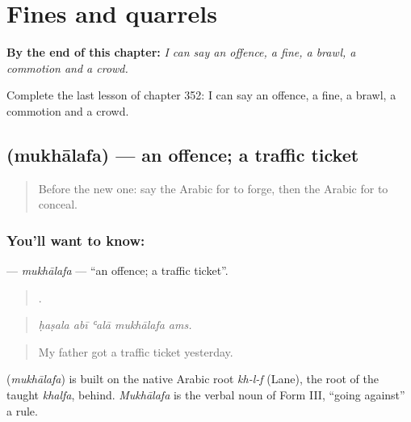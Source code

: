 
\chapter{Fines and quarrels}
\label{ch:ar-fines-and-quarrels}

\begin{chapteropening}
\textbf{By the end of this chapter:} \emph{I can say an offence, a fine, a brawl, a commotion and a crowd.}

Complete the last lesson of chapter 352: I can say an offence, a fine, a brawl, a commotion and a crowd.
\end{chapteropening}

\section[\texorpdfstring{\ar{مخالفة} (mukhālafa)}{مخالفة (mukhālafa)}]{ (mukhālafa) — an offence; a traffic ticket}

\label{lesson:AR-C352-mukhalafa}



\begin{quote}
Before the new one: say the Arabic for to forge, then the Arabic for to conceal.
\end{quote}

\subsection*{You'll want to know: }
\textbf{} — \emph{mukhālafa} — \textquotedblleft{}an offence; a traffic ticket\textquotedblright{}.

\begin{quote}
    .
\end{quote}

\begin{quote}
\emph{ḥaṣala abī ʿalā mukhālafa ams.}
\end{quote}

\begin{quote}
My father got a traffic ticket yesterday.
\end{quote}

\begin{cousinweb}
\textbf{} (\emph{mukhālafa}) is built on the native Arabic root \emph{kh-l-f} (Lane), the root of the taught \emph{khalfa}, behind. \emph{Mukhālafa} is the verbal noun of Form III, \textquotedblleft{}going against\textquotedblright{} a rule.
\end{cousinweb}

